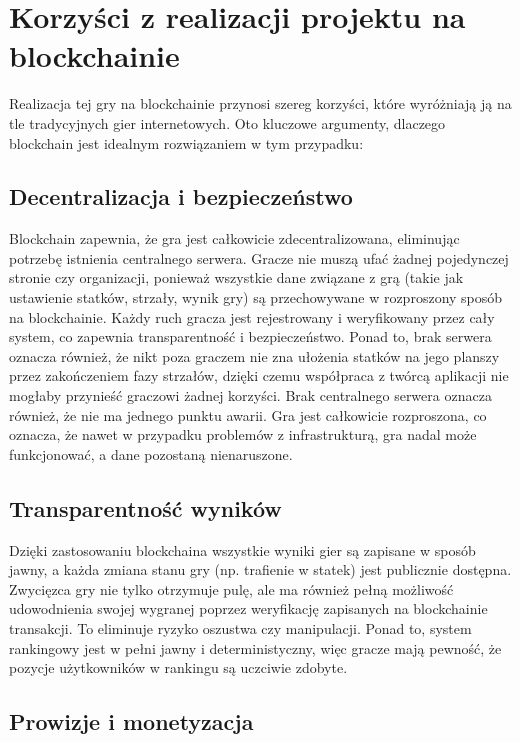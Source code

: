 \documentclass{article}
\begin{document}
\section{Korzyści z realizacji projektu na blockchainie}

Realizacja tej gry na blockchainie przynosi szereg korzyści, które wyróżniają ją na tle tradycyjnych gier internetowych. Oto kluczowe argumenty, dlaczego blockchain jest idealnym rozwiązaniem w tym przypadku:

\subsection{Decentralizacja i bezpieczeństwo}

Blockchain zapewnia, że gra jest całkowicie zdecentralizowana, eliminując potrzebę istnienia centralnego serwera. Gracze nie muszą ufać żadnej pojedynczej stronie czy organizacji, ponieważ wszystkie dane związane z grą (takie jak ustawienie statków, strzały, wynik gry) są przechowywane w rozproszony sposób na blockchainie. Każdy ruch gracza jest rejestrowany i weryfikowany przez cały system, co zapewnia transparentność i bezpieczeństwo. Ponad to, brak serwera oznacza również, że nikt poza graczem nie zna ułożenia statków na jego planszy przez zakończeniem fazy strzałów, dzięki czemu współpraca z twórcą aplikacji nie mogłaby przynieść graczowi żadnej korzyści. Brak centralnego serwera oznacza również, że nie ma jednego punktu awarii. Gra jest całkowicie rozproszona, co oznacza, że nawet w przypadku problemów z infrastrukturą, gra nadal może funkcjonować, a dane pozostaną nienaruszone.

\subsection{Transparentność wyników}

Dzięki zastosowaniu blockchaina wszystkie wyniki gier są zapisane w sposób jawny, a każda zmiana stanu gry (np. trafienie w statek) jest publicznie dostępna. Zwycięzca gry nie tylko otrzymuje pulę, ale ma również pełną możliwość udowodnienia swojej wygranej poprzez weryfikację zapisanych na blockchainie transakcji. To eliminuje ryzyko oszustwa czy manipulacji. Ponad to, system rankingowy jest w pełni jawny i deterministyczny, więc gracze mają pewność, że pozycje użytkowników w rankingu są uczciwie zdobyte.

\subsection{Prowizje i monetyzacja}
\end{document}
